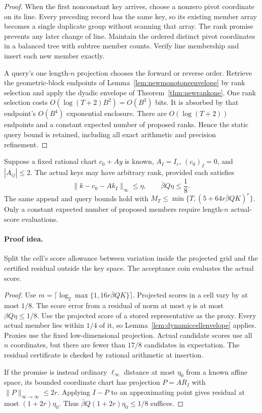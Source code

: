 \begin{proof}
When the first nonconstant key arrives, choose a nonzero pivot
coordinate on its line.  Every preceding record has the same
key, so its existing member array becomes a single duplicate
group without scanning that array.  The rank promise prevents
any later change of line.  Maintain the ordered distinct pivot
coordinates in a balanced tree with subtree member counts.
Verify line membership and insert each new member exactly.

A query's one length-$n$ projection chooses the forward or
reverse order.  Retrieve the geometric-block endpoints of
Lemma~\ref{lem:newmonotoneenvelope} by rank selection and apply
the dyadic envelope of Theorem~\ref{thm:newrankone}.  One rank
selection costs $O(\log(T+2)B^2)=O(B^3)$ bits.  It is absorbed
by that endpoint's $O(B^4)$ exponential enclosure.  There are
$O(\log(T+2))$ endpoints and a constant expected number of
proposed ranks.  Hence the static query bound is retained,
including all exact arithmetic and precision refinement.
\end{proof}

\begin{corollary}
\label{cor:dynamicapproximatespace}
Suppose a fixed rational chart $c_0+Ay$ is known,
$A_I=I_r$, $(c_0)_I=0$, and $|A_{ij}|\le2$.
The actual keys may have arbitrary rank, provided each satisfies
\[
 \|k-c_0-Ak_I\|_\infty\le\eta,
 \qquad \bar\beta Q\eta\le\frac18.
\]
The same append and query bounds hold with
$M_T\le\min\{T,(5+64r\bar\beta QK)^r\}$.
Only a constant expected number of proposed members require
length-$n$ actual-score evaluations.
\end{corollary}

\paragraph{Proof idea.}
Split the cell's score allowance between variation inside the
projected grid and the certified residual outside the key space.
The acceptance coin evaluates the actual score.

\begin{proof}
Use $m=\lceil\log_2\max\{1,16r\bar\beta QK\}\rceil$.
Projected scores in a cell vary by at most $1/8$.  The score
error from a residual of norm at most $\eta$ is at most
$\beta Q\eta\le1/8$.  Use the projected score of a stored
representative as the proxy.  Every actual member lies within
$1/4$ of it, so Lemma~\ref{lem:dynamiccellenvelope} applies.
Proxies use the fixed low-dimensional projection.  Actual
candidate scores use all $n$ coordinates, but there are fewer
than $17/8$ candidates in expectation.  The residual certificate
is checked by rational arithmetic at insertion.

If the promise is instead ordinary $\ell_\infty$ distance at
most $\eta_0$ from a known affine space, its bounded coordinate
chart has projection $P=AR_I$ with
$\|P\|_{\infty\to\infty}\le2r$.  Applying $I-P$ to an
approximating point gives residual at most $(1+2r)\eta_0$.
Thus $\bar\beta Q(1+2r)\eta_0\le1/8$ suffices.
\end{proof}

